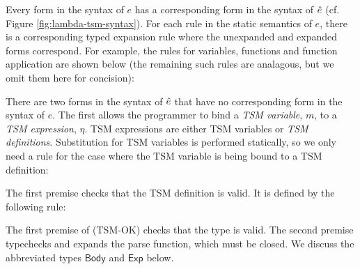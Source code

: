 {Every form in the syntax of $e$ has a corresponding form in the syntax of $\ue$ (cf. Figure \ref{fig:lambda-tsm-syntax}). For each rule in the static semantics of $e$, there is a corresponding typed expansion rule where the unexpanded and expanded forms correspond. For example, the rules for variables, functions and function application are shown below (the remaining such rules are analagous, but we omit them here for concision):
\begin{mathpar}


\end{mathpar}
There are two forms in the syntax of $\ue$ that have no corresponding form in the syntax of $e$. The first allows the programmer to bind a \emph{TSM variable}, $m$, to a \emph{TSM expression}, $\eta$. TSM expressions are either TSM variables or \emph{TSM definitions}. Substitution for TSM variables is performed statically, so we only need a rule for the case where the TSM variable is being bound to a TSM definition:
\begin{mathpar}
\end{mathpar}
The first premise checks that the TSM definition is valid. It is defined by the following rule:
\begin{mathpar}
\end{mathpar}
The first premise of (TSM-OK) checks that the type is valid. The second premise typechecks and expands the parse function, which must be closed. We discuss the abbreviated types $\mathsf{Body}$ and $\mathsf{Exp}$ below.

}
